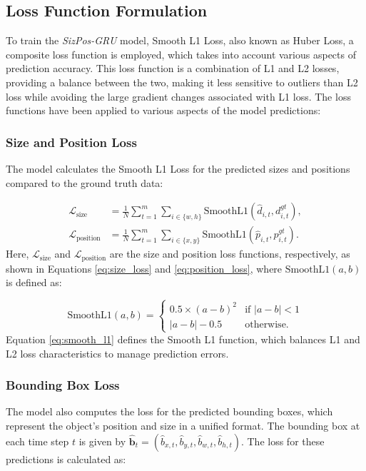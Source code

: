 \documentclass[12pt,oneside]{book} %
\begin{document}
\subsection{Loss Function Formulation}
To train the \textit{SizPos-GRU} model, Smooth L1 Loss, also known as Huber
Loss, a composite loss function is employed, which takes into account various
aspects of prediction accuracy. This loss function is a combination of L1 and
L2 losses, providing a balance between the two, making it less sensitive to
outliers than L2 loss while avoiding the large gradient changes associated with
L1 loss. The loss functions have been applied to various aspects of the model
predictions:

\subsubsection*{Size and Position Loss}
\noindent The model calculates the Smooth L1 Loss for the predicted sizes and positions compared to the ground truth data:

\begin{align}
    \mathcal{L}_{\text{size}}     & = \frac{1}{N} \sum_{t=1}^{m} \sum_{i \in \{w, h\}} \text{SmoothL1}\left(\hat{d}_{i,t}, d^{gt}_{i,t}\right),  \label{eq:size_loss}      \\
    \mathcal{L}_{\text{position}} & = \frac{1}{N} \sum_{t=1}^{m} \sum_{i \in \{x, y\}} \text{SmoothL1}\left(\hat{p}_{i,t}, p^{gt}_{i,t}\right).   \label{eq:position_loss}
\end{align}
Here, \(\mathcal{L}_{\text{size}}\) and \(\mathcal{L}_{\text{position}}\) are
the size and position loss functions, respectively, as shown in Equations
\eqref{eq:size_loss} and \eqref{eq:position_loss}, where \(\text{SmoothL1}(a,
b)\) is defined as:

\begin{equation}
    \text{SmoothL1}(a, b) =
    \begin{cases} 
        0.5 \times (a - b)^2 & \text{if } |a - b| < 1 \\ 
        |a - b| - 0.5        & \text{otherwise}.
    \end{cases} \label{eq:smooth_l1}
\end{equation}
Equation \eqref{eq:smooth_l1} defines the Smooth L1 function, which balances L1
and L2 loss characteristics to manage prediction errors.

\subsubsection*{Bounding Box Loss}
\noindent The model also computes the loss for the predicted bounding boxes, which represent the object's position and size in a unified format. The bounding box at each time step \(t\) is given by \(\hat{\mathbf{b}}_t = (\hat{b}_{x,t}, \hat{b}_{y,t}, \hat{b}_{w,t}, \hat{b}_{h,t})\). The loss for these predictions is calculated as:
\end{document}
